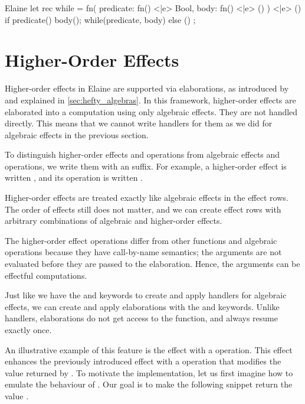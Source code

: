 \begin{lst}{Elaine}
let rec while = fn(
    predicate: fn() <|e> Bool,
    body: fn() <|e> ()
) <|e> () {
    if predicate() {
        body();
        while(predicate, body)
    } else {
        ()
    }
};
\end{lst}

\section{Higher-Order Effects}\label{sec:hoeffects}

Higher-order effects in Elaine are supported via elaborations, as introduced by \textcite{bach_poulsen_hefty_2023} and explained in \cref{sec:hefty_algebras}. In this framework, higher-order effects are elaborated into a computation using only algebraic effects. They are not handled directly. This means that we cannot write handlers for them as we did for algebraic effects in the previous section.

To distinguish higher-order effects and operations from algebraic effects and operations, we write them with an \el{!} suffix. For example, a higher-order  effect is written , and its  operation is written .

Higher-order effects are treated exactly like algebraic effects in the effect rows. The order of effects still does not matter, and we can create effect rows with arbitrary combinations of algebraic and higher-order effects.

The higher-order effect operations differ from other functions and algebraic operations because they have call-by-name semantics; the arguments are not evaluated before they are passed to the elaboration. Hence, the arguments can be effectful computations.

Just like we have the  and  keywords to create and apply handlers for algebraic effects, we can create and apply elaborations with the  and  keywords. Unlike handlers, elaborations do not get access to the  function, and always resume exactly once.

An illustrative example of this feature is the  effect with a  operation. This effect enhances the previously introduced  effect with a  operation that modifies the value returned by . To motivate the implementation, let us first imagine how to emulate the behaviour of . Our goal is to make the following snippet return the value .

